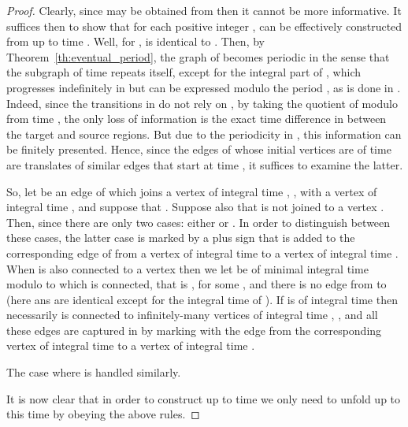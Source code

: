 \documentclass[11pt]{amsart}
\theoremstyle{definition}
\begin{document}
\begin{proof}
	Clearly, since  may be obtained from  then it cannot be more informative.
	It suffices then to show that for each positive integer ,  can be effectively constructed from  up to time .
	Well, for ,  is identical to .
	Then, by Theorem~\ref{th:eventual_period}, the graph of  becomes periodic in the sense that the subgraph of time  repeats itself, except for the integral part of , which progresses indefinitely in  but can be expressed modulo the period , as is done in .
	Indeed, since the transitions in  do not rely on , by taking the quotient of  modulo  from time , the only loss of information is the exact time difference in  between the target and source regions.
	But due to the periodicity in , this information can be finitely presented.
	Hence, since the edges of  whose initial vertices are of time  are translates of similar edges that start at time , it suffices to examine the latter.
		
	So, let  be an edge of  which joins a vertex  of integral time , , with a vertex  of integral time 
	, and suppose that .
	Suppose also that  is not joined to a vertex . 
	Then, since  there are only two cases: either  or .
	In order to distinguish between these cases, the latter case is marked by a plus sign that is added to the corresponding edge of  from a vertex of integral time  to a vertex of integral time .
	When  is also connected to a vertex  then we let  be of minimal integral time modulo  to which  is connected, that is , for some , and there is no edge from  to  (here  ans  are identical except for the integral time of ).
	If  is of integral time  then necessarily  is connected to infinitely-many vertices of integral time , , and all these edges are captured in  by marking with  the edge from the corresponding vertex of integral time  to a vertex of integral time . 
	
	The case where  is handled similarly.   
	 \iffalse	
	So, let  be a directed edge of  joining a vertex of integral time , to a vertex of integral time .
	Suppose also that  then there are then two possibilities.
	Either the edge represents a minimal time difference  or a minimal time difference .
	In order to distinguish between these two cases we mark the edge in the latter case with a plus sign.
	Since the period  satisfies  then if the time difference  , for some  then necessarily there exists also a similar edge with time difference , thus the minimal time difference cannot be , .
	However, we need also distinguish between the case where there is only one possible time difference  or there are infinitely-many time differences , , and in the latter case we mark the edge with .
	
	Similarly, when  then either the minimal time difference is  or a minimal time difference , and in the latter case we mark the edge with a plus sign.
	Again, we add also the  mark to represent the infinitely-many time differences , . 
	\fi
	It is now clear that in order to construct  up to time  we only need to unfold  up to this time by obeying the above rules.
\end{proof}
\end{document}
